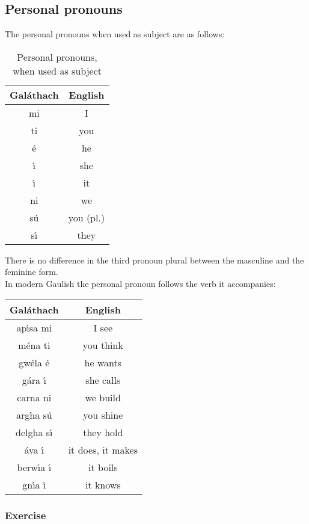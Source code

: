 \subsection{Personal pronouns}

The personal pronouns when used as subject are as follows:
\begin{table}[H]
\centering
\begin{tabu}{c|c}
  \textbf{Gal\'{a}thach} & \textbf{English}\\
  \toprule
  mi & I \\
  ti & you\\
  \'{e} & he\\
  \'{\i} & she\\
  \'{\i} & it\\
  ni & we\\
  s\'{u} & you (pl.)\\
  s\'{\i} & they\\
\end{tabu}
\caption{Personal pronouns, when used as subject}
\label{personal_pronouns_as_subject}
\end{table}

There is no difference in the third pronoun plural between the masculine and the feminine form.\\

In modern Gaulish the personal pronoun follows the verb it accompanies:
\begin{table}[H]
\centering
\begin{tabu}{c|c}
  \textbf{Gal\'{a}thach} & \textbf{English}\\
  \toprule
  ap\'{\i}sa mi & I see\\
  m\'{e}na ti & you think\\
  gw\'{e}la \'{e} & he wants\\
  g\'{a}ra \'{\i} & she calls\\
  carna ni & we build\\
  argha s\'{u} & you shine\\
  delgha s\'{\i} & they hold\\
  \'{a}va \'{\i} & it  does, it makes\\
  berw\'{\i}a \'{\i} & it boils\\
  gn\'{\i}a \'{\i} & it knows\\
\end{tabu}
\label{examples_personal_pronoun}
\end{table}

\newpage
\subsubsection{Exercise}

